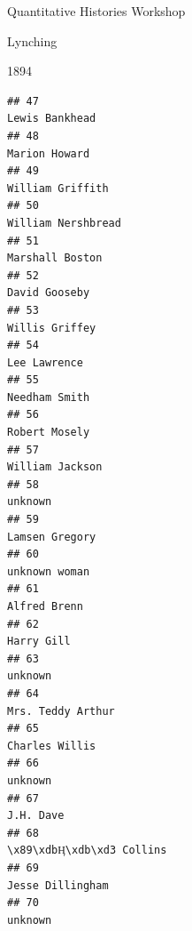 \documentclass[
  ignorenonframetext,
]{beamer}
\begin{document}
\begin{frame}[fragile]{Quantitative Histories Workshop}
\begin{block}{Lynching}
\begin{block}{1894}
\begin{verbatim}
## 47                                                                                            Lewis Bankhead
## 48                                                                                             Marion Howard
## 49                                                                                          William Griffith
## 50                                                                                        William Nershbread
## 51                                                                                           Marshall Boston
## 52                                                                                             David Gooseby
## 53                                                                                            Willis Griffey
## 54                                                                                              Lee Lawrence
## 55                                                                                             Needham Smith
## 56                                                                                             Robert Mosely
## 57                                                                                           William Jackson
## 58                                                                                                   unknown
## 59                                                                                            Lamsen Gregory
## 60                                                                                             unknown woman
## 61                                                                                              Alfred Brenn
## 62                                                                                                Harry Gill
## 63                                                                                                   unknown
## 64                                                                                         Mrs. Teddy Arthur
## 65                                                                                            Charles Willis
## 66                                                                                                   unknown
## 67                                                                                                 J.H. Dave
## 68                                                                                 \x89\xdbӉ\xdb\xd3 Collins
## 69                                                                                          Jesse Dillingham
## 70                                                                                                   unknown

\end{verbatim}
\end{block}
\end{block}
\end{frame}
\end{document}
